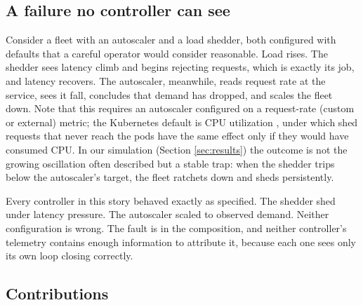 \documentclass[conference]{IEEEtran}
\begin{document}
\subsection{A failure no controller can see}

Consider a fleet with an autoscaler and a load shedder, both configured with
defaults that a careful operator would consider reasonable. Load rises. The
shedder sees latency climb and begins rejecting requests, which is exactly
its job, and latency recovers. The autoscaler, meanwhile, reads request rate
at the service, sees it fall, concludes that demand has dropped, and scales
the fleet down. Note that this requires an autoscaler configured on a
request-rate (custom or external) metric; the Kubernetes default is CPU
utilization \cite{k8shpa}, under which shed requests that never reach the pods
have the same effect only if they would have consumed CPU. In our simulation
(Section \ref{sec:results}) the outcome is not the growing oscillation often
described but a stable trap: when the shedder trips below the autoscaler's
target, the fleet ratchets down and sheds persistently.

Every controller in this story behaved exactly as specified. The shedder shed
under latency pressure. The autoscaler scaled to observed demand. Neither
configuration is wrong. The fault is in the composition, and neither
controller's telemetry contains enough information to attribute it, because
each one sees only its own loop closing correctly.

\subsection{Contributions}
\end{document}
